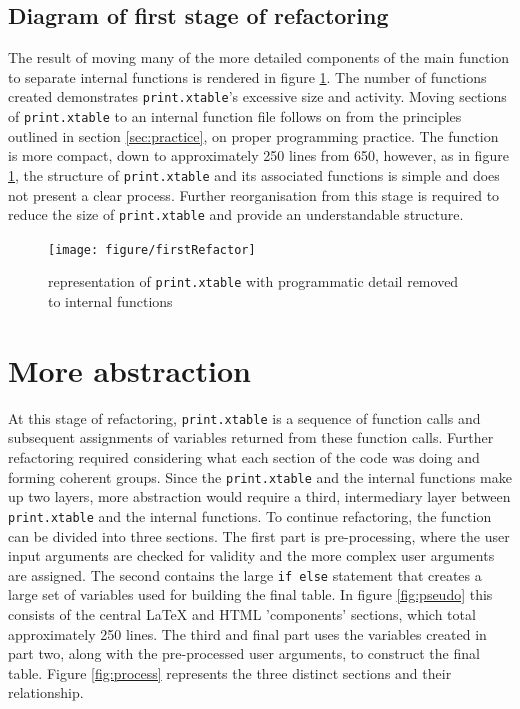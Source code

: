 \documentclass{memoir}\usepackage[]{graphicx}\usepackage[]{color}
\newenvironment{knitrout}{}{} %
\let\code=\texttt
\newcommand{\latex}{\LaTeX\xspace}
\begin{document}
\subsection{Diagram of first stage of refactoring}

The result of moving many of the more detailed components of the main function to separate internal functions is rendered in figure \ref{fig:firstRefactor}. The number of functions created demonstrates \code{print.xtable}'s excessive size and activity. Moving sections of \code{print.xtable} to an internal function file follows on from the principles outlined in section \ref{sec:practice}, on proper programming practice. The function is more compact, down to approximately 250 lines from 650, however, as in figure \ref{fig:firstRefactor}, the structure of \code{print.xtable} and its associated functions is simple and does not present a clear process. Further reorganisation from this stage is required to reduce the size of \code{print.xtable} and provide an understandable structure.

\begin{figure}[H]
\vspace{-80pt}
\begin{knitrout}
\color{fgcolor}
\texttt{[image: figure/firstRefactor]} 

\end{knitrout}
\vspace{-70pt}
\caption{representation of \code{print.xtable} with programmatic detail removed to internal functions}\label{fig:firstRefactor}
\end{figure}


\section{More abstraction}

At this stage of refactoring, \code{print.xtable} is a sequence of function calls and subsequent assignments of variables returned from these function calls. Further refactoring required considering what each section of the code was doing and forming coherent groups. Since the \code{print.xtable} and the internal functions make up two layers, more abstraction would require a third, intermediary layer between \code{print.xtable} and the internal functions. To continue refactoring, the function can be divided into three sections. The first part is pre-processing, where the user input arguments are checked for validity and the more complex user arguments are assigned. The second contains the large \code{if else} statement that creates a large set of variables used for building the final table. In figure \ref{fig:pseudo} this consists of the central \latex and HTML 'components' sections, which total approximately 250 lines. The third and final part uses the variables created in part two, along with the pre-processed user arguments, to construct the final table. Figure \ref{fig:process} represents the three distinct sections and their relationship.\\
\end{document}
